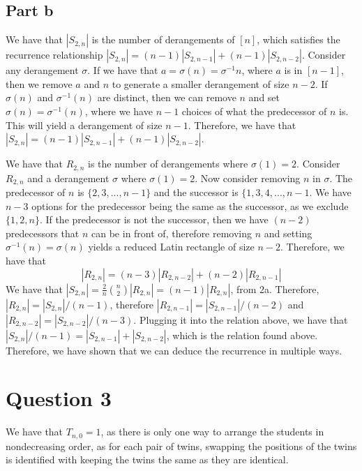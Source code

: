 \documentclass[]{article}
\begin{document}
\subsection{Part b}
We have that $|S_{2, n}|$ is the number of derangements of $[n]$, which satisfies the recurrence relationship $|S_{2, n}| = (n - 1) |S_{2, n-1}| + (n - 1)|S_{2, n-2}|$. Consider any derangement $\sigma$. If we have that $a = \sigma(n) = \sigma^{-1} n$, where $a$ is in $[n-1]$, then we remove $a$ and $n$ to generate a smaller derangement of size $n-2$. If $\sigma(n)$ and $\sigma^{-1}(n)$ are distinct, then we can remove $n$ and set $\sigma(n) = \sigma^{-1}(n)$, where we have $n-1$ choices of what the predecessor of $n$ is. This will yield a derangement of size $n-1$. Therefore, we have that $|S_{2, n}| = (n - 1) |S_{2, n-1}| + (n - 1)|S_{2, n-2}|$.

We have that $R_{2, n}$ is the number of derangements where $\sigma(1) = 2$. Consider $R_{2, n}$ and a derangement $\sigma$ where $\sigma(1) = 2$. Now consider removing $n$ in $\sigma$. The predecessor of $n$ is $\lbrace 2, 3, ..., n-1 \rbrace$ and the successor is $\lbrace 1, 3, 4, ... , n-1$. We have $n-3$ options for the predecessor being the same as the successor, as we exclude $\lbrace 1, 2, n \rbrace$. If the predecessor is not the successor, then we have $(n-2)$ predecessors that $n$ can be in front of, therefore removing $n$ and setting $\sigma^{-1}(n) = \sigma(n)$ yields a reduced Latin rectangle of size $n - 2$. Therefore, we have that
\begin{equation}
	|R_{2, n}| = (n - 3) |R_{2, n - 2}| + (n - 2) |R_{2, n-1}|
\end{equation}
We have that $|S_{2, n}| = \frac{2}{n} \binom{n}{2} |R_{2, n}| = (n-1) |R_{2,n}|$, from 2a. Therefore, $|R_{2, n}| = |S_{2, n}|/(n-1)$, therefore $|R_{2, n-1}| = |S_{2, n-1}|/(n-2)$ and $|R_{2, n-2}| = |S_{2, n-2}|/(n-3)$. Plugging it into the relation above, we have that $|S_{2, n}|/(n-1) = |S_{2, n-1}| + |S_{2, n-2}|$, which is the relation found above. Therefore, we have shown that we can deduce the recurrence in multiple ways. 

\newpage
\section{Question 3}
We have that $T_{n, 0} = 1$, as there is only one way to arrange the students in nondecreasing order, as for each pair of twins, swapping the positions of the twins is identified with keeping the twins the same as they are identical. 
\end{document}
